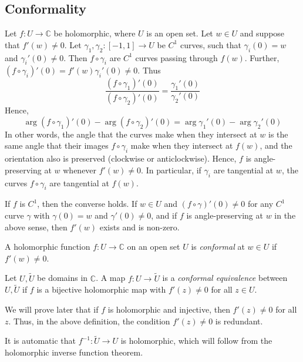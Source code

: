 \subsection{Conformality}
Let \( f \colon U \to \mathbb C \) be holomorphic, where \( U \) is an open set.
Let \( w \in U \) and suppose that \( f'(w) \neq 0 \).
Let \( \gamma_1, \gamma_2 \colon [-1, 1] \to U \) be \( C^1 \) curves, such that \( \gamma_i(0) = w \) and \( \gamma_i'(0) \neq 0 \).
Then \( f \circ \gamma_i \) are \( C^1 \) curves passing through \( f(w) \).
Further, \( (f \circ \gamma_i)'(0) = f'(w) \gamma_i'(0) \neq 0 \).
Thus
\[ \frac{(f \circ \gamma_1)'(0)}{(f \circ \gamma_2)'(0)} = \frac{\gamma_1'(0)}{\gamma_2'(0)} \]
Hence,
\[ \arg(f \circ \gamma_1)'(0) - \arg(f \circ \gamma_2)'(0) = \arg \gamma_1'(0) - \arg \gamma_2'(0) \]
In other words, the angle that the curves make when they intersect at \( w \) is the same angle that their images \( f \circ \gamma_i \) make when they intersect at \( f(w) \), and the orientation also is preserved (clockwise or anticlockwise).
Hence, \( f \) is angle-preserving at \( w \) whenever \( f'(w) \neq 0 \).
In particular, if \( \gamma_i \) are tangential at \( w \), the curves \( f \circ \gamma_i \) are tangential at \( f(w) \).
\begin{remark}
	If \( f \) is \( C^1 \), then the converse holds. If \( w \in U \) and \( (f \circ \gamma)'(0) \neq 0 \) for any \( C^1 \) curve \( \gamma \) with \( \gamma(0) = w \) and \( \gamma'(0) \neq 0 \), and if \( f \) is angle-preserving at \( w \) in the above sense, then \( f'(w) \) exists and is non-zero.
\end{remark}
\begin{definition}
	A holomorphic function \( f \colon U \to \mathbb C \) on an open set \( U \) is \textit{conformal} at \( w \in U \) if \( f'(w) \neq 0 \).
\end{definition}
\begin{definition}
	Let \( U, \widetilde U \) be domains in \( \mathbb C \).
	A map \( f \colon U \to \widetilde U \) is a \textit{conformal equivalence} between \( U, \widetilde U \) if \( f \) is a bijective holomorphic map with \( f'(z) \neq 0 \) for all \( z \in U \).
\end{definition}
\begin{remark}
	We will prove later that if \( f \) is holomorphic and injective, then \( f'(z) \neq 0 \) for all \( z \).
	Thus, in the above definition, the condition \( f'(z) \neq 0 \) is redundant.
\end{remark}
\begin{remark}
	It is automatic that \( f^{-1} \colon \widetilde U \to U \) is holomorphic, which will follow from the holomorphic inverse function theorem.
\end{remark}
